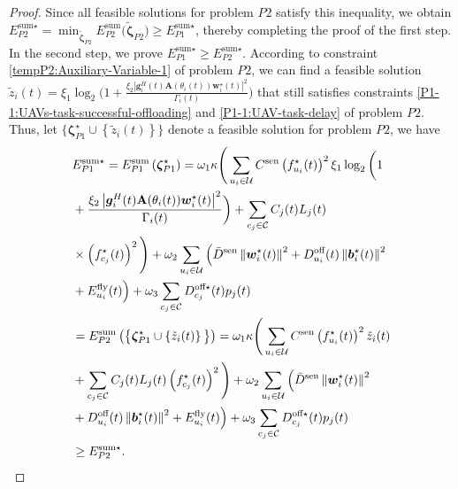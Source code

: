 \documentclass[10pt,journal,compsoc]{IEEEtran}
\newtheorem*{proof}{Proof}
\begin{document}
\begin{proof}
    Since all feasible solutions for problem $P2$ satisfy this inequality, we obtain ${E}_{P2}^{\text{sum} \star} = \min_{\tilde{\bm{\zeta}}_{P2}}E^{\text{sum}}_{P2}\big(\tilde{\bm{\zeta}}_{P2}\big) \ge {E}_{P1}^{\text{sum} \star}$, thereby completing the proof of the first step.
    In the second step, we prove ${E}_{P1}^{\text{sum} \star} \ge {E}_{P2}^{\text{sum} \star}$.
    According to constraint \eqref{tempP2:Auxiliary-Variable-1} of problem $P2$, we can find a feasible solution $\tilde{z}_{i}(t) = \xi_{1} \log_2 \Big(1 + \frac{\xi_{2} \left|\bm{g}^{H}_{i}(t)\mathbf{A}(\theta_{i}(t)) \bm{w}^{\star}_{i}(t)\right|^{2}}{\Gamma_{i}(t)}\Big)$ that still satisfies constraints \eqref{P1-1:UAVs-task-successful-offloading} and \eqref{P1-1:UAV-task-delay} of problem $P2$.
    Thus, let $\big\{{\bm{\zeta}}^{\star}_{P1} \cup \left\{\tilde{z}_{i}(t)\right\}\big\}$ denote a feasible solution for problem $P2$, we have
    \begin{align}
        & E^{\text{sum}\star}_{P1} = E^{\text{sum}}_{P1}\left({\bm{\zeta}}^{\star}_{P1}\right) = \omega_{1}\kappa \Bigg(\sum_{u_{i} \in \mathcal{U}} C^{\text{sen}}\left({f}^{\star}_{u_{i}}(t)\right)^{2} \xi_{1} \log_2 \bigg(1  \notag \\
        & + \frac{\xi_{2} \left|\bm{g}^{H}_{i}(t)\mathbf{A}(\theta_{i}(t)) \bm{w}^{\star}_{i}(t)\right|^{2}}{\Gamma_{i}(t)}\bigg) + \sum_{c_{j} \in \mathcal{C}} C_{{j}}(t)L_{j}(t)  \notag \\
        & \times \left({f}^{\star}_{c_{j}}(t)\right)^{2} \Bigg) + \omega_{2}\sum_{u_{i} \in \mathcal{U}} \Big(\bar{D}^{\text{sen}}\left\|{\bm{w}}^{\star}_{i}(t)\right\|^{2} + D_{u_{i}}^{\text{off}}(t) \left\|{\bm{b}}^{\star}_{i}(t)\right\|^{2} \notag \\
        & + E_{u_{i}}^{\text{fly}}(t)\Big) + \omega_{3}\sum_{c_{j} \in \mathcal{C}}{D}_{c_{j}}^{\text{off} \star}(t)p_{j}(t) \notag \\
        & = E_{P2}^{\text{sum}}\left(\big\{{\bm{\zeta}}^{\star}_{P1} \cup \left\{\tilde{z}_{i}(t)\right\}\big\}\right) = \omega_{1}\kappa \Bigg(\sum_{u_{i} \in \mathcal{U}} C^{\text{sen}}\left({f}^{\star}_{u_{i}}(t)\right)^{2} \tilde{z}_{i}(t) \notag \\
        & + \sum_{c_{j} \in \mathcal{C}} C_{{j}}(t)L_{j}(t)\left({f}^{\star}_{c_{j}}(t)\right)^{2} \Bigg) + \omega_{2}\sum_{u_{i} \in \mathcal{U}} \Big(\bar{D}^{\text{sen}}\left\|{\bm{w}}^{\star}_{i}(t)\right\|^{2}\notag \\
        & + D_{u_{i}}^{\text{off}}(t)\left\|{\bm{b}}^{\star}_{i}(t)\right\|^{2} + E_{u_{i}}^{\text{fly}}(t)\Big) + \omega_{3}\sum_{c_{j} \in \mathcal{C}}{D}_{c_{j}}^{\text{off} \star}(t)p_{j}(t) \notag \\
        & \ge  E_{P2}^{\text{sum} \star}.
    \end{align}


\end{proof}
\end{document}
